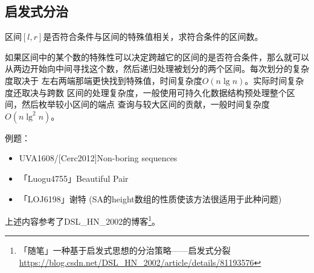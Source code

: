 \subsection{启发式分治}
区间$[l,r]$是否符合条件与区间的特殊值相关，求符合条件的区间数。

如果区间中的某个数的特殊性可以决定跨越它的区间的是否符合条件，那么就可以
从两边开始向中间寻找这个数，然后递归处理被划分的两个区间。每次划分的复杂度取决于
左右两端那端更快找到特殊值，时间复杂度$O(n\lg n)$。实际时间复杂度还取决与跨数
区间的处理复杂度，一般使用可持久化数据结构预处理整个区间，然后枚举较小区间的端点
查询与较大区间的贡献，一般时间复杂度$O(n\lg^2 n)$。

例题：
\begin{itemize}
	\item UVA1608/[Cerc2012]Non-boring sequences
	\item 「Luogu4755」Beautiful Pair
	\item 「LOJ6198」谢特 (SA的height数组的性质使该方法很适用于此种问题)
\end{itemize}

上述内容参考了DSL\_HN\_2002的博客\footnote{
	「随笔」一种基于启发式思想的分治策略——启发式分裂
	\url{https://blog.csdn.net/DSL\_HN\_2002/article/details/81193576}
}。
